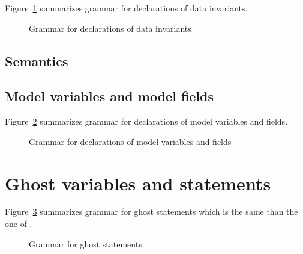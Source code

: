 \nodiff

Figure~\ref{fig:gram:datainvariants} summarizes grammar for declarations of data
invariants.
\begin{figure}[htbp]
  \caption{Grammar for declarations of data invariants}
\label{fig:gram:datainvariants}
\end{figure}


\subsection{Semantics}
\nodiff


\subsection{Model variables and model fields}

\nodiff

Figure~\ref{fig:gram:model} summarizes grammar for declarations of model
variables and fields.
\begin{figure}[htbp]
  \caption{Grammar for declarations of model variables and fields}
\label{fig:gram:model}
\end{figure}


\section{Ghost variables and statements}
\label{sec:ghost}


Figure~\ref{fig:gram:ghost} summarizes grammar for ghost statements which is the
same than the one of \acsl.
\begin{figure}[htbp]
  \caption{Grammar for ghost statements}
\label{fig:gram:ghost}
\end{figure}



